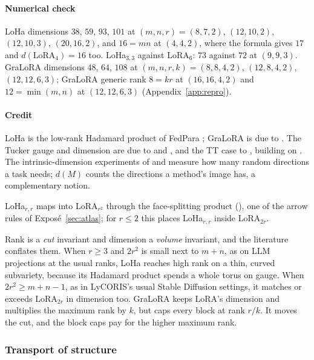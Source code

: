 \paragraph{Numerical check}
LoHa dimensions $38$, $59$, $93$, $101$ at $(m,n,r)=(8,7,2)$, $(12,10,2)$, $(12,10,3)$, $(20,16,2)$, and $16=mn$ at
$(4,4,2)$, where the formula gives $17$ and $d(\mathrm{LoRA}_4)=16$ too. LoHa$_{3,3}$ against LoRA$_6$: $73$ against
$72$ at $(9,9,3)$. GraLoRA dimensions $48$, $64$, $108$ at $(m,n,r,k)=(8,8,4,2)$, $(12,8,4,2)$, $(12,12,6,3)$; GraLoRA
generic rank $8=kr$ at $(16,16,4,2)$ and $12=\min(m,n)$ at $(12,12,6,3)$ (Appendix~\ref{app:repro}).

\paragraph{Credit}
LoHa is the low-rank Hadamard product of FedPara \citep{hyeonwoo2021fedpara}; GraLoRA is due to \citet{jung2025gralora}.
The Tucker gauge and dimension are due to \citet{xkoch2010dynamical} and \citet{xuschmajew2013geometry}, and the TT case
to \citet{xholtz2012manifolds}, building on \citet{oseledets2011tensor}. The intrinsic-dimension experiments of
\citet{li2018measuring} and \citet{aghajanyan2020intrinsic} measure how many random directions a task needs; $d(M)$
counts the directions a method's image has, a complementary notion.

LoHa$_{r,r}$ maps into LoRA$_{r^2}$ through the face-splitting product (), one of the arrow rules of
Exposé~\ref{sec:atlas}; for $r\le2$ this places LoHa$_{r,r}$ inside LoRA$_{2r}$.

\begin{explains}
Rank is a \emph{cut} invariant and dimension a \emph{volume} invariant, and the literature conflates them. When $r\ge3$
and $2r^2$ is small next to $m+n$, as on LLM projections at the usual ranks, LoHa reaches high rank on a thin, curved
subvariety, because its Hadamard product spends a whole torus on gauge. When $2r^2\ge m+n-1$, as in LyCORIS's usual
Stable Diffusion settings, it matches or exceeds LoRA$_{2r}$ in dimension too. GraLoRA keeps LoRA's dimension and
multiplies the maximum rank by $k$, but caps every block at rank $r/k$. It moves the cut, and the block caps pay for the
higher maximum rank.
\end{explains}

\subsubsection{Transport of structure}\label{sec:cut-transport}


